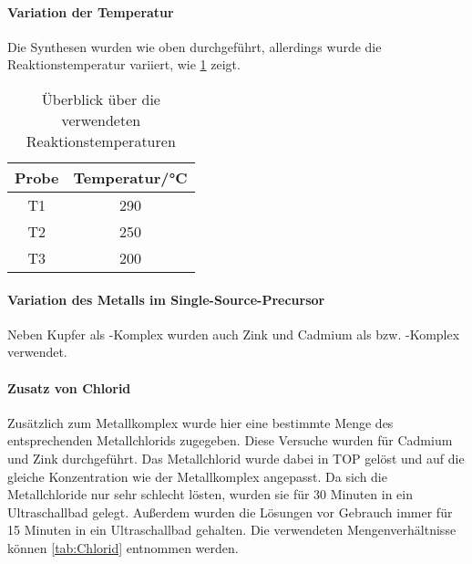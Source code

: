 				\paragraph{Variation der Temperatur}
				\qquad\newline
					Die Synthesen wurden wie oben durchgeführt, allerdings wurde die Reaktionstemperatur variiert, wie \cref{tab:Temperatur} zeigt.
					
					\begin{table}[H]
						\centering
						\caption{Überblick über die verwendeten Reaktionstemperaturen}
						\label{tab:Temperatur}
						\begin{tabular}{cc}
							\toprule
							Probe & Temperatur/\si{\degreeCelsius}\\
							\midrule
							T1 & 290\\
							T2 & 250\\
							T3 & 200\\
							\bottomrule
						\end{tabular}
					\end{table}
				
				\paragraph{Variation des Metalls im Single-Source-Precursor}
				\qquad\newline
					Neben Kupfer als -Komplex wurden auch Zink und Cadmium als  bzw. -Komplex verwendet.
					
				\paragraph{Zusatz von Chlorid}
				\qquad\newline
					Zusätzlich zum Metallkomplex wurde hier eine bestimmte Menge des entsprechenden Metallchlorids zugegeben.
					Diese Versuche wurden für Cadmium und Zink durchgeführt.
					Das Metallchlorid wurde dabei in TOP gelöst und auf die gleiche Konzentration wie der Metallkomplex angepasst.
					Da sich die Metallchloride nur sehr schlecht lösten, wurden sie für 30 Minuten in ein Ultraschallbad gelegt.
					Außerdem wurden die Lösungen vor Gebrauch immer für 15 Minuten in ein Ultraschallbad gehalten. 
					Die verwendeten Mengenverhältnisse können \cref{tab:Chlorid} entnommen werden.
					
